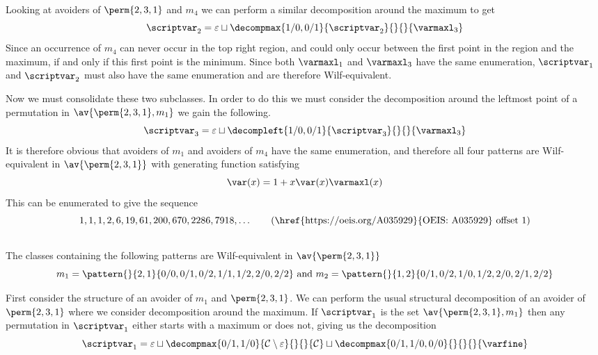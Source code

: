 Looking at avoiders of \(\perm{2,3,1}\) and \(m_4\) we
can perform a similar decomposition around the maximum to get
\begin{equation*}
    \scriptvar_2 = \varepsilon \sqcup
    \decompmax{1/0,0/1}{\scriptvar_2}{}{}{\mathcal{\varmaxl}_3}
\end{equation*}
Since an occurrence of \(m_4\) can never occur in the
top right region, and could only occur between the first point
in the region and the maximum, if and only if this first point is the minimum.
Since both \(\mathcal{\varmaxl}_1\) and \(\mathcal{\varmaxl}_3\) have the same
enumeration, \(\scriptvar_1\) and \(\scriptvar_2\) must also have
the same enumeration and are therefore Wilf-equivalent.

Now we must consolidate these two subclasses. In order to do this we must
consider the decomposition around the leftmost point of a permutation in
\(\av{\perm{2,3,1},m_1}\) we gain the following.
\begin{equation*}
    \scriptvar_3 = \varepsilon \sqcup
    \decompleft{1/0,0/1}{\scriptvar_3}{}{}{\mathcal{\varmaxl}_3}
\end{equation*}
It is therefore obvious that avoiders of \(m_1\) and avoiders of \(m_4\)
have the same enumeration, and therefore all four patterns are Wilf-equivalent
in \(\av{\perm{2,3,1}}\) with generating function satisfying
\begin{equation*}
    \var(x) = 1 + x\var(x)\varmaxl(x)
\end{equation*}
This can be enumerated to give the sequence
\begin{equation*}
    1, 1, 1, 2, 6, 19, 61, 200, 670, 2286, 7918,\dotsc \tag{\href{https://oeis.org/A035929}{OEIS: A035929} offset 1}
\end{equation*}

\subsection{}
\nextvar
The classes containing the following patterns are Wilf-equivalent
in \(\av{\perm{2,3,1}}\)
\begin{equation*}
    m_1 = \pattern{}{2,1}{0/0,0/1,0/2,
                    1/1,1/2,
                    2/0,2/2}
    \text{ and }
    m_2 = \pattern{}{1,2}{0/1,0/2,
                    1/0,1/2,
                    2/0,2/1,2/2}
\end{equation*}

First consider the structure of an avoider of \(m_1\) and \(\perm{2,3,1}\).
We can perform the usual structural decomposition of an avoider
of \(\perm{2,3,1}\) where we consider decomposition around the maximum.
If \(\scriptvar_1\) is the set \(\av{\perm{2,3,1},m_1}\) then any permutation in
\(\scriptvar_1\) either starts with a maximum or does not, giving us the
decomposition
\begin{equation*}
    \scriptvar_1 = \varepsilon \sqcup
    \decompmax{0/1,1/0}{\mathcal{C}\setminus\varepsilon}{}{}{\mathcal{C}} \sqcup
    \decompmax{0/1,1/0,0/0}{}{}{}{\mathcal{\varfine}}
\end{equation*}

